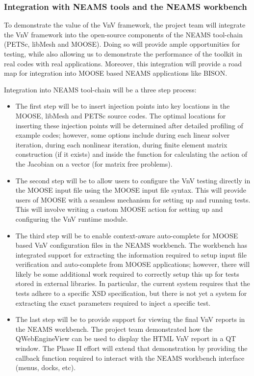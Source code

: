 \subsubsection{Integration with NEAMS tools and the NEAMS workbench} 

To demonstrate the value of the VnV framework, the project team will integrate the VnV framework into the open-source components of the NEAMS tool-chain (PETSc, libMesh and MOOSE). Doing so will provide ample opportunities for testing, while also allowing us to demonstrate the performance of the toolkit in real codes with real applications. Moreover, this integration will provide a road map for integration into MOOSE based NEAMS applications like BISON. 

Integration into NEAMS tool-chain will be a three step process:

\begin{itemize}
 \item The first step will be to insert injection points into key locations in the MOOSE, libMesh and PETSc source codes. The optimal locations for inserting these injection points will be determined after detailed profiling of example codes; however, some options include during each linear solver iteration, during each nonlinear iteration, during finite element matrix construction (if it exists) and inside the function for calculating the action of the Jacobian
 on a vector (for matrix free problems). 
 
 \item The second step will be to allow users to configure the VnV testing directly in the MOOSE input file using the MOOSE input file syntax. This will provide users of MOOSE with a seamless mechanism for setting up and running tests. This will involve writing a custom MOOSE action for setting up and configuring the VnV runtime module.
 \item The third step will be to enable context-aware auto-complete for MOOSE based VnV configuration files in the NEAMS workbench. The workbench has integrated support for extracting the information required to setup input file verification and auto-complete from MOOSE applications; however, there will likely be some additional work required to correctly setup this up for tests stored in external libraries. In particular, the current system requires that the tests adhere to a specific XSD specification, but there is not yet a system for extracting the exact parameters required to inject a specific test. 
 \item The last step will be to provide support for viewing the final VnV reports in the NEAMS workbench. The project team demonstrated how the QWebEngineView can be used to display the HTML VnV report in a QT window. The Phase II effort will extend that demonstration by providing the callback function required to interact with the NEAMS workbench interface (menus, docks, etc).
\end{itemize}

